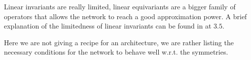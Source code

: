 \documentclass[../3.tex]{subfiles}
\begin{document}
    Linear invariants are really limited, linear equivariants are a bigger family of operators that allows the network to reach a good approximation
    power. A brief explanation of the limitedness of linear invariants can be found in \cite{2021geo} at $3.5$.
    
    Here we are not giving a recipe for an architecture, we are rather listing the necessary conditions for the network to behave well w.r.t. the symmetries.
\end{document}
